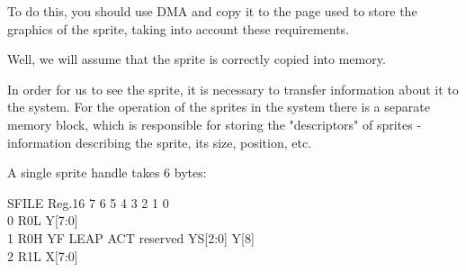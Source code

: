 To do this, you should use DMA and copy it to the page used to store
the graphics of the sprite, taking into account these requirements.

Well, we will assume that the sprite is correctly copied into memory. 

In order for us to see the sprite, it is necessary to transfer
information about it to the system. For the operation of the sprites
in the system there is a separate memory block, which is responsible
for storing the "descriptors" of sprites - information describing the
sprite, its size, position, etc.

A single sprite handle takes 6 bytes:

SFILE	Reg.16	7	6	5	4	        3    2    1        	0\\
0	R0L	Y[7:0]							\\
1	R0H	YF	LEAP	ACT	reserved	YS[2:0]			Y[8]\\
2	R1L	X[7:0]							
%
%
%
%
